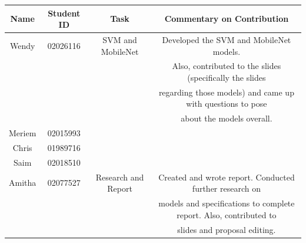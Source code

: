 \documentclass{article}
\theoremstyle{plain}
\theoremstyle{definition}
\theoremstyle{remark}
\begin{document}
\begin{table}
    \centering
    \begin{tabular}{| c | c | c | c |}
        \hline
        \textbf{Name} & \textbf{Student ID} & \textbf{Task} & \textbf{Commentary on Contribution} \\
        \hline
        Wendy & 02026116 & SVM and MobileNet & Developed the SVM and MobileNet models. \\ 
        & & & Also, contributed to the slides (specifically the slides \\
        & & & regarding those models) and came up with questions to pose \\
        & & & about the models overall. \\
        \hline
        Meriem & 02015993 & & \\
        \hline
        Chris & 01989716 & & \\
        \hline
        Saim & 02018510 & & \\
        \hline
        Amitha & 02077527 & Research and Report & Created and wrote report. Conducted further research on \\ 
        & & & models and specifications to complete report. Also, contributed to \\
        & & & slides and proposal editing. \\
        \hline
    \end{tabular}
\end{table}
\end{document}
